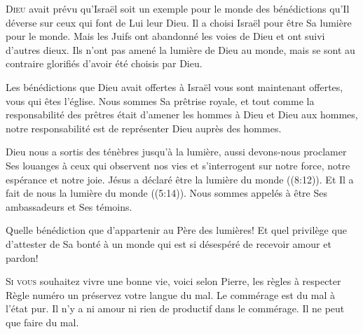 
\lettrine{D}{ieu} avait prévu qu'Israël soit un exemple pour le monde
 des bénédictions qu'Il déverse sur ceux qui font de Lui leur Dieu.
 Il a choisi Israël pour être Sa lumière pour le monde.
 Mais les Juifs ont abandonné les voies de Dieu et ont suivi d'autres dieux.
 Ils n'ont pas amené la lumière de Dieu au monde, mais se sont au contraire
 glorifiés d'avoir été choisis par Dieu.

Les bénédictions que Dieu avait offertes à Israël vous sont maintenant offertes,
 vous qui êtes l'église. 
 Nous sommes Sa prêtrise royale, et tout comme la responsabilité des prêtres
 était d'amener les hommes à Dieu et Dieu aux hommes,
 notre responsabilité est de représenter Dieu auprès des hommes.


Dieu nous a sortis des ténèbres jusqu'à la lumière, aussi devons-nous proclamer
 Ses louanges à ceux qui observent nos vies et s'interrogent sur notre force,
 notre espérance et notre joie. Jésus a déclaré être
 \Og la lumière du monde \Fg{} ((8:12)).
 Et Il a fait de nous \Og la lumière du monde \Fg{} ((5:14)).
 Nous sommes appelés à être Ses ambassadeurs et Ses témoins.

Quelle bénédiction que d'appartenir au Père des lumières!
 Et quel privilège que d'attester de Sa bonté à un monde qui est si désespéré
 de recevoir amour et pardon! 

\dvrule






\lettrine{S}{i vous} souhaitez vivre une bonne vie,
 voici selon Pierre, les règles à respecter\frcolon{} \\[1ex]
Règle numéro un\frcolon{} préservez votre langue du mal.
 Le commérage est du mal à l'état pur. Il n'y a ni amour ni rien de productif
 dans le commérage. Il ne peut que faire du mal.

